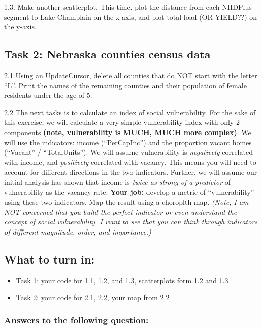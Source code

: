 \documentclass[]{article}
\begin{document}
1.3. Make another scatterplot. This time, plot the distance from each
NHDPlus segment to Lake Champlain on the x-axis, and plot total load (OR
YIELD??) on the y-axis.

\hypertarget{task-2-nebraska-counties-census-data}{%
\subsection{Task 2: Nebraska counties census
data}\label{task-2-nebraska-counties-census-data}}

2.1 Using an UpdateCursor, delete all counties that do NOT start with
the letter ``L''. Print the names of the remaining counties and their
population of female residents under the age of 5.

2.2 The next tasks is to calculate an index of social vulnerability. For
the sake of this exercise, we will calculate a very simple vulnerability
index with only 2 components \textbf{(note, vulnerability is MUCH, MUCH
more complex)}. We will use the indicators: income (``PerCapInc'') and
the proportion vacant homes (``Vacant'' / ``TotalUnits''). We will
assume vulnerability is \emph{negatively} correlated with income, and
\emph{positively} correlated with vacancy. This means you will need to
account for different directions in the two indicators. Further, we will
assume our initial analysis has shown that income is \emph{twice as
strong of a predictor} of vulnerability as the vacancy rate.
\textbf{Your job:} develop a metric of ``vulnerability'' using these two
indicators. Map the result using a choroplth map. \emph{(Note, I am NOT
concerned that you build the perfect indicator or even understand the
concept of social vulnerability. I want to see that you can think
through indicators of different magnitude, order, and importance.)}

\newpage

\hypertarget{what-to-turn-in}{%
\subsection{What to turn in:}\label{what-to-turn-in}}

\begin{itemize}
\item
  Task 1: your code for 1.1, 1.2, and 1.3, scatterplots form 1.2 and 1.3
\item
  Task 2: your code for 2.1, 2.2, your map from 2.2
\end{itemize}

\hypertarget{answers-to-the-following-question}{%
\subsubsection{Answers to the following
question:}\label{answers-to-the-following-question}}
\end{document}

